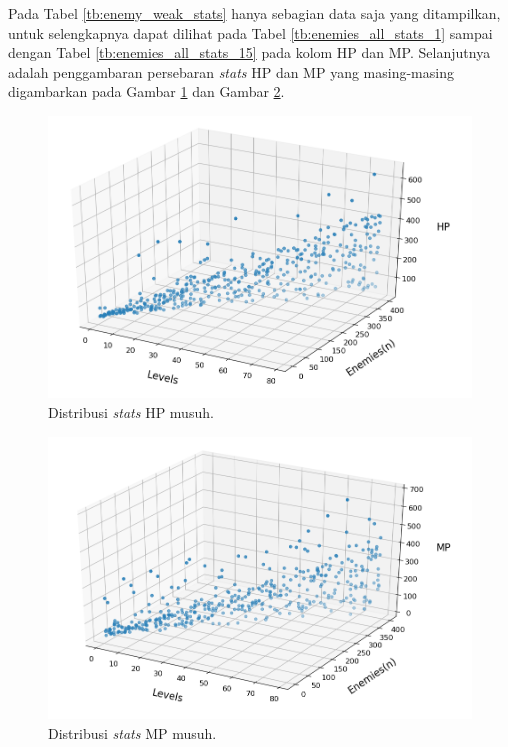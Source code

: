 Pada Tabel \ref{tb:enemy_weak_stats} hanya sebagian data saja yang ditampilkan, untuk selengkapnya dapat dilihat pada Tabel \ref{tb:enemies_all_stats_1} sampai dengan Tabel \ref{tb:enemies_all_stats_15} pada kolom HP dan MP. Selanjutnya adalah penggambaran persebaran \textit{stats} HP dan MP yang masing-masing digambarkan pada Gambar \ref{fig:enemy_hp_distrib} dan Gambar \ref{fig:enemy_mp_distrib}.
\vspace{1ex}

\begin{figure} [!h] \centering
	\centering
	\includegraphics[scale=0.57]{img/EnemyHpDistrib.png}
	\caption{Distribusi \textit{stats} HP musuh.}
	\label{fig:enemy_hp_distrib}
\end{figure}

\begin{figure} [!h] \centering
	\centering
	\includegraphics[scale=0.57]{img/EnemyMpDistrib.png}
	\caption{Distribusi \textit{stats} MP musuh.}
	\label{fig:enemy_mp_distrib}
\end{figure}

